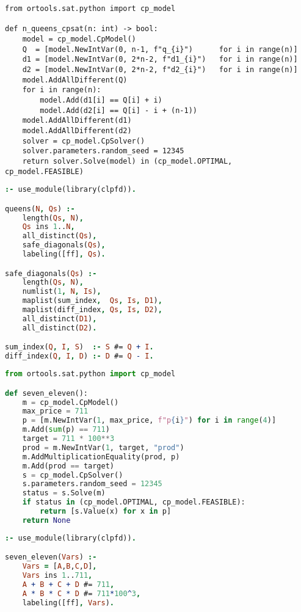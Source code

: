 \documentclass[12pt,a4paper]{article}
\begin{document}
\begin{lstlisting}[caption={N-Queens in CP-SAT -- Modellierung und Lösung},label={lst:nqueens-model}]
from ortools.sat.python import cp_model

def n_queens_cpsat(n: int) -> bool:
    model = cp_model.CpModel()
    Q  = [model.NewIntVar(0, n-1, f"q_{i}")      for i in range(n)]
    d1 = [model.NewIntVar(0, 2*n-2, f"d1_{i}")   for i in range(n)]
    d2 = [model.NewIntVar(0, 2*n-2, f"d2_{i}")   for i in range(n)]
    model.AddAllDifferent(Q)
    for i in range(n):
        model.Add(d1[i] == Q[i] + i)
        model.Add(d2[i] == Q[i] - i + (n-1))
    model.AddAllDifferent(d1)
    model.AddAllDifferent(d2)
    solver = cp_model.CpSolver()
    solver.parameters.random_seed = 12345
    return solver.Solve(model) in (cp_model.OPTIMAL, cp_model.FEASIBLE)
\end{lstlisting}

\begin{lstlisting}[language=Prolog,
  caption={N-Queens in CLP(FD) -- Modellierung und Lösung},
  label={lst:nqueens-clpfd}]
:- use_module(library(clpfd)).

queens(N, Qs) :-
    length(Qs, N),
    Qs ins 1..N,
    all_distinct(Qs),
    safe_diagonals(Qs),
    labeling([ff], Qs).

safe_diagonals(Qs) :-
    length(Qs, N),
    numlist(1, N, Is),
    maplist(sum_index,  Qs, Is, D1),
    maplist(diff_index, Qs, Is, D2),
    all_distinct(D1),
    all_distinct(D2).

sum_index(Q, I, S)  :- S #= Q + I.
diff_index(Q, I, D) :- D #= Q - I.
\end{lstlisting}

\begin{lstlisting}[language=Python,
  caption={7--11 in CP-SAT -- Modellierung und Lösung},
  label={lst:seven-eleven-cpsat}]
from ortools.sat.python import cp_model

def seven_eleven():
    m = cp_model.CpModel()
    max_price = 711
    p = [m.NewIntVar(1, max_price, f"p{i}") for i in range(4)]
    m.Add(sum(p) == 711)
    target = 711 * 100**3
    prod = m.NewIntVar(1, target, "prod")
    m.AddMultiplicationEquality(prod, p)
    m.Add(prod == target)
    s = cp_model.CpSolver()
    s.parameters.random_seed = 12345
    status = s.Solve(m)
    if status in (cp_model.OPTIMAL, cp_model.FEASIBLE):
        return [s.Value(x) for x in p]
    return None
\end{lstlisting}

\begin{lstlisting}[language=Prolog,
  caption={7--11 in CLP(FD) -- Modellierung und Lösung},
  label={lst:seven-eleven-clpfd}]
:- use_module(library(clpfd)).

seven_eleven(Vars) :-
    Vars = [A,B,C,D],
    Vars ins 1..711,
    A + B + C + D #= 711,
    A * B * C * D #= 711*100^3,
    labeling([ff], Vars).
\end{lstlisting}
\end{document}
